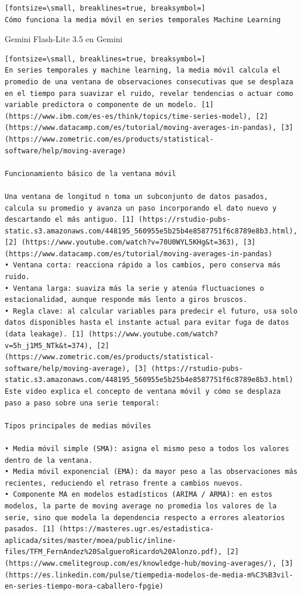 \documentclass[12pt,a4paper,oneside]{book}
\begin{document}
\begin{iaprompt}
\begin{Verbatim}[fontsize=\small, breaklines=true, breaksymbol=]
Cómo funciona la media móvil en series temporales Machine Learning
\end{Verbatim}
\end{iaprompt}
\begin{iaresp}{Gemini Flash-Lite 3.5 en Gemini}
\begin{Verbatim}[fontsize=\small, breaklines=true, breaksymbol=]
En series temporales y machine learning, la media móvil calcula el promedio de una ventana de observaciones consecutivas que se desplaza en el tiempo para suavizar el ruido, revelar tendencias o actuar como variable predictora o componente de un modelo. [1] (https://www.ibm.com/es-es/think/topics/time-series-model), [2] (https://www.datacamp.com/es/tutorial/moving-averages-in-pandas), [3] (https://www.zometric.com/es/products/statistical-software/help/moving-average)

Funcionamiento básico de la ventana móvil

Una ventana de longitud n toma un subconjunto de datos pasados, calcula su promedio y avanza un paso incorporando el dato nuevo y descartando el más antiguo. [1] (https://rstudio-pubs-static.s3.amazonaws.com/448195_560955e5b25b4e8587751f6c8789e8b3.html), [2] (https://www.youtube.com/watch?v=70U0WYL5KHg&t=363), [3] (https://www.datacamp.com/es/tutorial/moving-averages-in-pandas)
• Ventana corta: reacciona rápido a los cambios, pero conserva más ruido.
• Ventana larga: suaviza más la serie y atenúa fluctuaciones o estacionalidad, aunque responde más lento a giros bruscos.
• Regla clave: al calcular variables para predecir el futuro, usa solo datos disponibles hasta el instante actual para evitar fuga de datos (data leakage). [1] (https://www.youtube.com/watch?v=5h_j1M5_NTk&t=374), [2] (https://www.zometric.com/es/products/statistical-software/help/moving-average), [3] (https://rstudio-pubs-static.s3.amazonaws.com/448195_560955e5b25b4e8587751f6c8789e8b3.html)
Este video explica el concepto de ventana móvil y cómo se desplaza paso a paso sobre una serie temporal:

Tipos principales de medias móviles

• Media móvil simple (SMA): asigna el mismo peso a todos los valores dentro de la ventana.
• Media móvil exponencial (EMA): da mayor peso a las observaciones más recientes, reduciendo el retraso frente a cambios nuevos.
• Componente MA en modelos estadísticos (ARIMA / ARMA): en estos modelos, la parte de moving average no promedia los valores de la serie, sino que modela la dependencia respecto a errores aleatorios pasados. [1] (https://masteres.ugr.es/estadistica-aplicada/sites/master/moea/public/inline-files/TFM_FernAndez%20SalgueroRicardo%20Alonzo.pdf), [2] (https://www.cmelitegroup.com/es/knowledge-hub/moving-averages/), [3] (https://es.linkedin.com/pulse/tiempedia-modelos-de-media-m%C3%B3vil-en-series-tiempo-mora-caballero-fpgie)


\end{Verbatim}
\end{iaresp}
\end{document}
